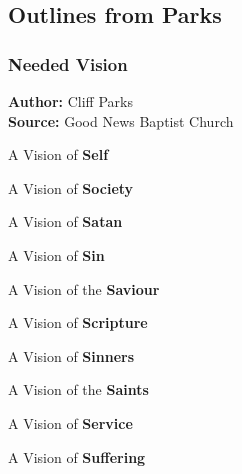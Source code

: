 
\subsection{Outlines from Parks}

\subsubsection{Needed Vision}

\textbf{Author: } Cliff Parks \\
\noindent \textbf{Source:} Good News Baptist Church\\


\begin{compactenum}[I.]
    \item A Vision of \textbf{Self}
    \item A Vision of \textbf{Society}
    \item A Vision of \textbf{Satan}
    \item A Vision of \textbf{Sin}
    \item A Vision of the \textbf{Saviour}
    \item A Vision of \textbf{Scripture}
    \item A Vision of \textbf{Sinners}
    \item A Vision of the \textbf{Saints}
    \item A Vision of \textbf{Service}
    \item A Vision of \textbf{Suffering}
\end{compactenum}
